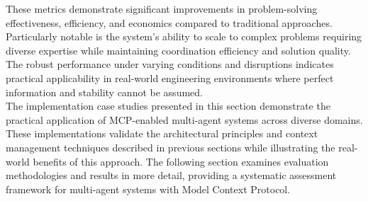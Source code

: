 These metrics demonstrate significant improvements in problem-solving effectiveness, efficiency, and economics compared to traditional approaches. Particularly notable is the system's ability to scale to complex problems requiring diverse expertise while maintaining coordination efficiency and solution quality. The robust performance under varying conditions and disruptions indicates practical applicability in real-world engineering environments where perfect information and stability cannot be assumed.\\ \newline
The implementation case studies presented in this section demonstrate the practical application of MCP-enabled multi-agent systems across diverse domains. These implementations validate the architectural principles and context management techniques described in previous sections while illustrating the real-world benefits of this approach. The following section examines evaluation methodologies and results in more detail, providing a systematic assessment framework for multi-agent systems with Model Context Protocol.\\ \newline
